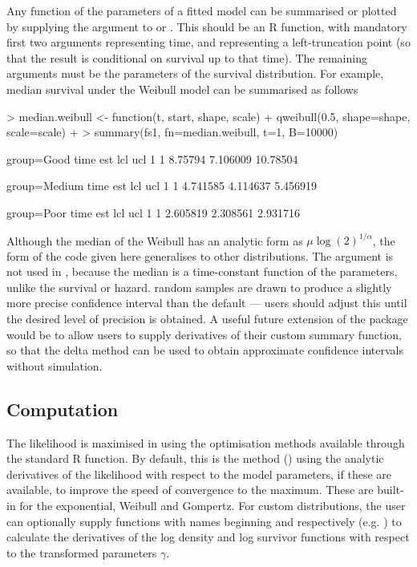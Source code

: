 \documentclass[nojss,nofooter]{jss}
\begin{document}
Any function of the parameters of a fitted model can be summarised or plotted by
supplying the argument  to  or
.  This should be an R function, with mandatory
first two arguments  representing time, and 
representing a left-truncation point (so that the result is
conditional on survival up to that time). The remaining arguments must
be the parameters of the survival distribution.  For example, median 
survival under the Weibull model  can be summarised as follows
\begin{Schunk}
\begin{Sinput}
> median.weibull <- function(t, start, shape, scale) { 
+     qweibull(0.5, shape=shape, scale=scale) 
+ }
> summary(fs1, fn=median.weibull, t=1, B=10000)
\end{Sinput}
\begin{Soutput}
group=Good 
  time     est      lcl      ucl
1    1 8.75794 7.106009 10.78504

group=Medium 
  time      est      lcl      ucl
1    1 4.741585 4.114637 5.456919

group=Poor 
  time      est      lcl      ucl
1    1 2.605819 2.308561 2.931716
\end{Soutput}
\end{Schunk}
Although the median of the Weibull has an analytic form as $\mu
\log(2)^{1/\alpha}$, the form of the code given here generalises to
other distributions.
The argument  is not used in , because
the median is a time-constant function of the parameters, unlike the
survival or hazard.   random samples are drawn to produce
a slightly more precise confidence interval than the default --- users
should adjust this until the desired level of precision is obtained.
A useful future extension of the package would be to allow users to 
supply derivatives of their custom summary function, so that the 
delta method can be used to obtain approximate confidence intervals 
without simulation.


\subsection{Computation}

The likelihood is maximised in  using the
optimisation methods available through the standard R 
function.  By default, this is the  method (\citep{nash})
using the analytic derivatives of the likelihood with respect to the
model parameters, if these are available, to improve the speed of
convergence to the maximum.  These are built-in for the exponential,
Weibull and Gompertz.  %
For custom distributions, the user can optionally supply functions
with names beginning  and  respectively
(e.g. ) to calculate the derivatives of
the log density and log survivor functions with respect to the
transformed parameters $\gamma$.
\end{document}

